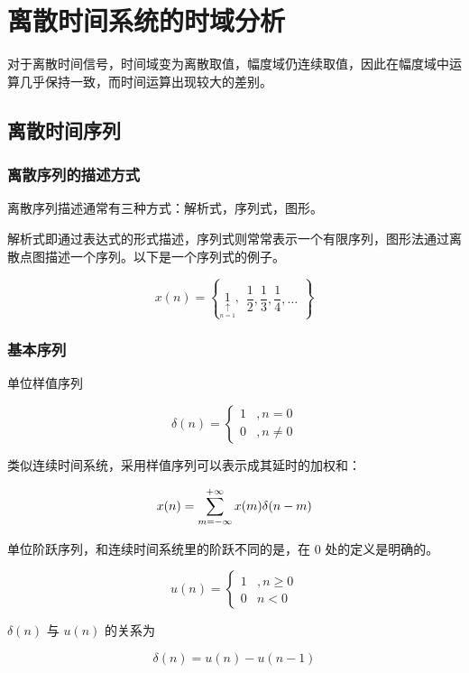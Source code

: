 \documentclass[cn,11pt,chinese,black,simple]{../elegantbook}
\begin{document}
\fi 

\chapter{离散时间系统的时域分析}

对于离散时间信号，时间域变为离散取值，幅度域仍连续取值，因此在幅度域中运算几乎保持一致，而时间运算出现较大的差别。


\section{离散时间序列}

\subsection{离散序列的描述方式}

离散序列描述通常有三种方式：解析式，序列式，图形。

解析式即通过表达式的形式描述，序列式则常常表示一个有限序列，图形法通过离散点图描述一个序列。以下是一个序列式的例子。


\[x(n)=\left\{
    \underset{\mathop{\uparrow}\limits_{n=1}}{1},
    \begin{array}{l}
    \dfrac{1}{2}, \dfrac{1}{3}, \dfrac{1}{4}, \dots
\end{array}\right\}\]

\subsection{基本序列}

单位样值序列 

\[\delta(n)=\left\{\begin{array}{ll}
    1 & ,n=0 \\
    0 & ,n \neq 0
\end{array}\right.\]

类似连续时间系统，采用样值序列可以表示成其延时的加权和：

\[x(n)=\displaystyle\sum_{m=-\infty}^{+\infty} x(m) \delta(n-m)\]

单位阶跃序列，和连续时间系统里的阶跃不同的是，在 \(0\) 处的定义是明确的。

\[
u(n)=\left\{\begin{array}{ll}
1 & ,n \geq 0 \\
0 & n < 0
\end{array}\right.
\]

\(\delta(n)\) 与 \(u(n)\) 的关系为

\[
\delta(n)=u(n)-u(n-1)
\]
\end{document}

